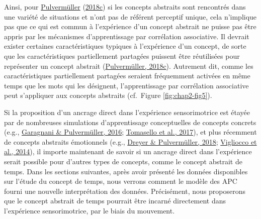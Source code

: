 \documentclass[
  a4paper,12pt,twoside,onecolumn,openright,final,oldfontcommands]{memoir}
\begin{document}
Ainsi, pour \protect\hyperlink{ref-pulvermuller_case_2018}{Pulvermüller} (\protect\hyperlink{ref-pulvermuller_case_2018}{2018c}) si les concepts abstraits sont rencontrés dans une variété de situations et n'ont pas de référent perceptif unique, cela n'implique pas que ce qui est commun à l'expérience d'un concept abstrait ne puisse pas être appris par les mécanismes d'apprentissage par corrélation associative. Il devrait exister certaines caractéristiques typiques à l'expérience d'un concept, de sorte que les caractéristiques partiellement partagées puissent être réutilisées pour représenter un concept abstrait (\protect\hyperlink{ref-pulvermuller_case_2018}{Pulvermüller, 2018c}). Autrement dit, comme les caractéristiques partiellement partagées seraient fréquemment activées en même temps que les mots qui les désignent, l'apprentissage par corrélation associative peut s'appliquer aux concepts abstraits (cf.~Figure \ref{fig:chap2-fig5}).

Si la proposition d'un ancrage direct dans l'expérience sensorimotrice est étayée par de nombreuses simulations d'apprentissage conceptuelles de concepts concrets (e.g., \protect\hyperlink{ref-garagnani_conceptual_2016}{Garagnani \& Pulvermüller, 2016}; \protect\hyperlink{ref-tomasello_brain_2017}{Tomasello et al., 2017}), et plus récemment de concepts abstraits émotionnels (e.g., \protect\hyperlink{ref-dreyer_abstract_2018}{Dreyer \& Pulvermüller, 2018}; \protect\hyperlink{ref-vigliocco_neural_2014}{Vigliocco et al., 2014}), il importe maintenant de savoir si un ancrage direct dans l'expérience serait possible pour d'autres types de concepts, comme le concept abstrait de temps. Dans les sections suivantes, après avoir présenté les données disponibles sur l'étude du concept de temps, nous verrons comment le modèle des APC fourni une nouvelle interprétation des données. Précisément, nous proposerons que le concept abstrait de temps pourrait être incarné directement dans l'expérience sensorimotrice, par le biais du mouvement.
\end{document}
